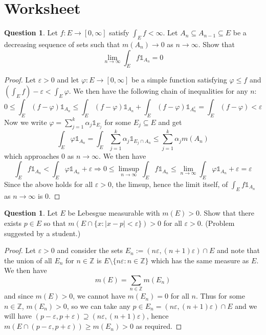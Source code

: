 \documentclass{article}
\newcommand{\longimplies}{\Longrightarrow}
\newcommand{\Z}{\mathbb{Z}}
\theoremstyle{definition} %
\numberwithin{thm}{section} %
\theoremstyle{definition} %
\newtheorem{question}[thm]{Question}
\begin{document}
\section{Worksheet}

\begin{question}
Let $f : E \to [0, \infty]$ satisfy $\int_E f < \infty$. Let $A_n \subseteq A_{n-1} \subseteq E$ be a decreasing sequence of sets such that $m(A_n) \to 0$ as $n \to \infty$. Show that
\[
\lim_{n \to \infty} \int_E f \mathds{1}_{A_n} = 0
\]
\end{question}
\begin{proof}
Let $\varepsilon > 0$ and let $\varphi: E \to [0, \infty]$ be a simple function satisfying $\varphi \leq f$ and $(\int_E f) - \varepsilon < \int_E \varphi$. We then have the following chain of inequalities for any $n$:
\[ 0 \leq \int_E (f - \varphi)\mathds{1}_{A_n} \leq \int_E (f - \varphi)\mathds{1}_{A_n} + \int_E (f - \varphi)\mathds{1}_{A_n^c} = \int_E (f - \varphi) < \varepsilon \]
Now we write $\varphi = \sum_{j = 1}^k \alpha_j \mathds{1}_{E_j}$ for some $E_j \subseteq E$ and get 
\[ \int_E \varphi\mathds{1}_{A_n} = \int_E \sum_{j = 1}^k \alpha_j \mathds{1}_{E_j \cap A_n} \leq \sum_{j = 1}^k \alpha_j m(A_n) \]
which approaches 0 as $n \to \infty$. We then have 
\[ \int_E f\mathds{1}_{A_n} < \int_E \varphi\mathds{1}_{A_n} + \varepsilon \longimplies 0 \leq \limsup_{n \to \infty} \int_E f\mathds{1}_{A_n} \leq \lim_{n \to \infty}\int_E \varphi\mathds{1}_{A_n} + \varepsilon = \varepsilon \]
Since the above holds for all $\varepsilon > 0$, the limsup, hence the limit itself, of $\int_E f\mathds{1}_{A_n}$ as $n \to \infty$ is 0.
\end{proof}

\begin{question}
Let $E$ be Lebesgue measurable with $m(E) > 0$. Show that there exists $p \in E$ so that $m(E \cap \{x : |x - p| < \varepsilon \}) > 0$ for all $\varepsilon > 0$. (Problem suggested by a student.)
\end{question}
\begin{proof}
Let $\varepsilon > 0$ and consider the sets $E_n := (n\varepsilon, (n + 1)\varepsilon) \cap E$ and note that the union of all $E_n$ for $n \in \Z$ is $E \setminus \{n\varepsilon: n \in \Z\}$ which has the same measure as $E$. We then have 
\[ m(E) = \sum_{n \in \Z} m(E_n) \]
and since $m(E) > 0$, we cannot have $m(E_n) = 0$ for all $n$. Thus for some $n \in \Z$, $m(E_n) > 0$, so we can take any $p \in E_n = (n\varepsilon, (n + 1)\varepsilon) \cap E$ and we will have $(p - \varepsilon, p + \varepsilon) \supseteq (n\varepsilon, (n + 1)\varepsilon)$, hence $m(E \cap (p - \varepsilon, p + \varepsilon)) \geq m(E_n) > 0$ as required.
\end{proof}
\end{document}
